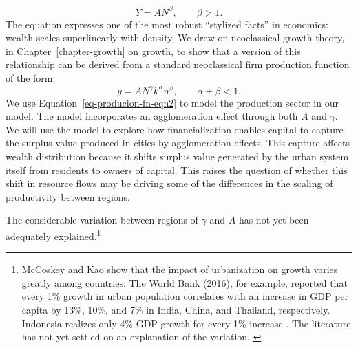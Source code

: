 \begin{equation}\label{eq-agglom-eqn2}
    Y=AN^\beta,\qquad \beta>1. 
\end{equation}
The equation expresses one of the most robust ``stylized facts'' in economics: wealth scales superlinearly with density.  We drew on neoclassical growth theory, in Chapter~\ref{chapter-growth} on growth, to show that a version of this relationship can be derived from a standard neoclassical firm production function of the form: 
\begin{equation}\label{eq-producion-fn-eqn2}
    y=AN^\gamma k^\alpha n^\beta,\qquad \alpha+\beta<1. 
\end{equation}
We use Equation~\ref{eq-producion-fn-eqn2} to model the production sector in our model. The model incorporates an agglomeration effect through both $A$ and $\gamma$. We will use the model to explore how financialization enables capital to capture the surplus value produced in cities by agglomeration effects. This capture affects wealth distribution because it shifts surplus value generated by the urban system itself from residents to owners of capital. %
This raises the question of whether this shift in resource flows may be driving some of the differences in the scaling of productivity between regions.


The considerable variation between regions of $\gamma$ and $A$ \cite{mccoskeyPanelDataInvestigation1999, haryantotriRelationshipUrbanizationEducation2021, pugaMagnitudeCausesAgglomeration2010, loboUrbanScalingProduction2013} has not yet been adequately explained.\footnote{McCoskey and Kao \cite{mccoskeyPanelDataInvestigation1999} show that the impact of urbanization on growth varies greatly among countries. The World Bank (2016), for example, reported that every 1\% growth in urban population correlates with an increase in GDP per capita by 13\%, 10\%, and 7\% in India, China, and Thailand, respectively. Indonesia realizes only 4\% GDP growth for every 1\% increase \cite{haryantotriRelationshipUrbanizationEducation2021}.  The literature has not yet settled on an explanation of the variation.  \cite{loboUrbanScalingProduction2013, pugaMagnitudeCausesAgglomeration2010}} 

